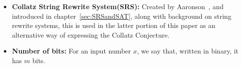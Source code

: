 \begin{itemize}
\begin{itemize}
      \end{itemize}
\item \textbf{Collatz String Rewrite System(SRS):} Created by Aaronson~\cite{HeuleAaronson}, and introduced in chapter~\ref{sec:SRSandSAT}, along with background on string rewrite systems, this is used in the latter portion of this paper as an alternative way of expressing the Collatz Conjecture.
\item \textbf{Number of bits:} For an input number $x$, we say that, written in binary, it has $m$ bits.
\end{itemize}

